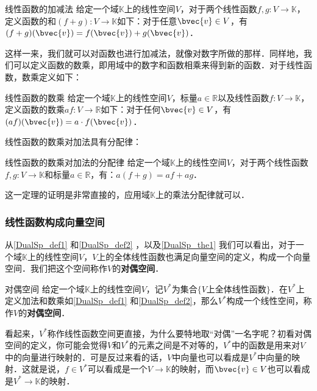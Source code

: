 \begin{definition}{线性函数的加减法}\label{DualSp_def1}
给定一个域$\mathbb{K}$上的线性空间$V$，对于两个线性函数$f, g: V\rightarrow\mathbb{K}$，定义函数的和$(f+g):V\rightarrow\mathbb{K}$如下：对于任意$\bvec{v}\in V$，有$(f+g)(\bvec{v})=f(\bvec{v})+g(\bvec{v})$．
\end{definition}

这样一来，我们就可以对函数也进行加减法，就像对数字所做的那样．同样地，我们可以定义函数的数乘，即用域中的数字和函数相乘来得到新的函数．对于线性函数，数乘定义如下：

\begin{definition}{线性函数的数乘}\label{DualSp_def2}
给定一个域$\mathbb{K}$上的线性空间$V$，标量$a\in\mathbb{R}$以及线性函数$f: V\rightarrow\mathbb{K}$，定义函数的数乘$af:V\rightarrow\mathbb{R}$如下：对于任何$\bvec{v}\in V$，有$(af)(\bvec{v})=a\cdot f(\bvec{v})$．
\end{definition}

线性函数的数乘对加法具有分配律：

\begin{theorem}{线性函数的数乘对加法的分配律}\label{DualSp_the1}
给定一个域$\mathbb{K}$上的线性空间$V$，对于两个线性函数$f, g: V\rightarrow\mathbb{K}$和标量$a\in\mathbb{R}$，有：$a(f+g)=af+ag$．
\end{theorem}

这一定理的证明是非常直接的，应用域$\mathbb{K}$上的乘法分配律就可以．

\subsubsection{线性函数构成向量空间}

从\autoref{DualSp_def1} 和\autoref{DualSp_def2} ，以及\autoref{DualSp_the1} 我们可以看出，对于一个域$\mathbb{K}$上的线性空间$V$，$V$上的全体线性函数也满足向量空间的定义，构成一个向量空间．我们把这个空间称作$V$的\textbf{对偶空间}．

\begin{definition}{对偶空间}
给定一个域$\mathbb{K}$上的线性空间$V$，记$V^*$为集合$\{V\text{上全体线性函数}\}$．在$V^*$上定义加法和数乘如\autoref{DualSp_def1} 和\autoref{DualSp_def2}，那么$V^*$构成一个线性空间，称作$V$的\textbf{对偶空间}．
\end{definition}

看起来，$V^*$称作线性函数空间更直接，为什么要特地取“对偶”一名字呢？初看对偶空间的定义，你可能会觉得$V$和$V^*$的元素之间是不对等的，$V^*$中的函数是用来对$V$中的向量进行映射的．可是反过来看的话，$V$中向量也可以看成是$V^*$中向量的映射．这就是说，$f\in V^*$可以看成是一个$V\rightarrow\mathbb{K}$的映射，而$\bvec{v}\in V$也可以看成是$V^*\rightarrow\mathbb{K}$的映射．

